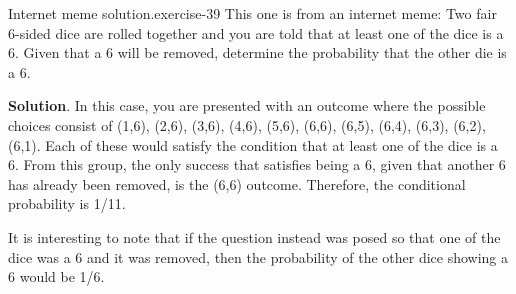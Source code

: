 \documentclass[10pt,]{book}
\numberwithin{equation}{section}
\begin{document}
\begin{inlineexercise}{Internet meme solution.}{exercise-39}%
\hypertarget{p-623}{}%
This one is from an internet meme:  Two fair 6-sided dice are rolled together and you are told that at least one of the dice is a 6. Given that a 6 will be removed, determine the probability that the other die is a 6.%
\par\smallskip%
\noindent\textbf{Solution}.\hypertarget{solution-16}{}\quad%
\hypertarget{p-624}{}%
In this case, you are presented with an outcome where the possible choices consist of (1,6), (2,6), (3,6), (4,6), (5,6), (6,6), (6,5), (6,4), (6,3), (6,2), (6,1).  Each of these would satisfy the condition that at least one of the dice is a 6. From this group, the only success that satisfies being a 6, given that another 6 has already been removed, is the (6,6) outcome. Therefore, the conditional probability is 1/11.%
\par
\hypertarget{p-625}{}%
It is interesting to note that if the question instead was posed so that one of the dice was a 6 and it was removed, then the probability of the other dice showing a 6 would be 1/6.%
\end{inlineexercise}
%
\par
\hypertarget{p-626}{}%
\end{document}
